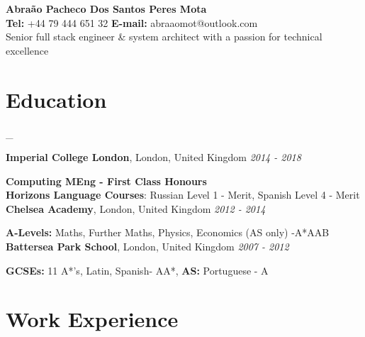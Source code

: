 \documentclass[a4paper,10pt]{article}
\begin{document}
	
	\begin{center}
		{\Large\bfseries Abra\~ao Pacheco Dos Santos Peres Mota} \\
		\vspace{2mm}
		{\textbf{Tel:} +44 79 444 651 32  } {\textbf{E-mail:} abraaomot@outlook.com } \\ \vspace{1mm}
	Senior full stack engineer \&  system architect with a passion for technical excellence
	\end{center}

	\section*{Education}_
		
		\textbf{Imperial College London}, London, United Kingdom \hfill \textit{2014 - 2018}
		
		\textbf{Computing MEng - First Class Honours} \\
		
		\textbf{Horizons Language Courses}: Russian Level 1 - Merit, Spanish Level 4 - Merit \\

		\textbf{Chelsea Academy}, London, United Kingdom \hfill \textit{2012 - 2014 }
		
		\textbf{A-Levels:} Maths, Further Maths, Physics, Economics (AS only) -A*AAB \\

		\textbf{Battersea Park School}, London, United Kingdom \hfill \textit{2007 - 2012} 
		
		\textbf{GCSEs:} 11 A*'s, Latin, Spanish- AA*, \textbf{AS:} Portuguese - A
		
	
	
	
	
	\section*{Work Experience}
	
\end{document}
